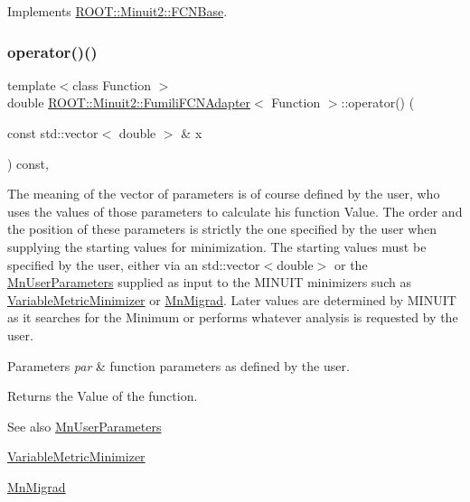 Implements \mbox{\hyperlink{classROOT_1_1Minuit2_1_1FCNBase_ae4a86bd94d0d0f5ca6fc8f8ab2bb43cd}{R\+O\+O\+T\+::\+Minuit2\+::\+F\+C\+N\+Base}}.

\mbox{\label{classROOT_1_1Minuit2_1_1FumiliFCNAdapter_a7381e9f93fbec9e0504e3e340c281056}} 
\subsubsection{\texorpdfstring{operator()()}{operator()()}\hspace{0.1cm}{\footnotesize\ttfamily [2/4]}}
{\footnotesize\ttfamily template$<$class Function $>$ \\
double \mbox{\hyperlink{classROOT_1_1Minuit2_1_1FumiliFCNAdapter}{R\+O\+O\+T\+::\+Minuit2\+::\+Fumili\+F\+C\+N\+Adapter}}$<$ Function $>$\+::operator() (\begin{DoxyParamCaption}\item[{const std\+::vector$<$ double $>$ \&}]{x }\end{DoxyParamCaption}) const\hspace{0.3cm}{\ttfamily [inline]}, {\ttfamily [virtual]}}

The meaning of the vector of parameters is of course defined by the user, who uses the values of those parameters to calculate his function Value. The order and the position of these parameters is strictly the one specified by the user when supplying the starting values for minimization. The starting values must be specified by the user, either via an std\+::vector$<$double$>$ or the \mbox{\hyperlink{classROOT_1_1Minuit2_1_1MnUserParameters}{Mn\+User\+Parameters}} supplied as input to the M\+I\+N\+U\+IT minimizers such as \mbox{\hyperlink{classROOT_1_1Minuit2_1_1VariableMetricMinimizer}{Variable\+Metric\+Minimizer}} or \mbox{\hyperlink{classROOT_1_1Minuit2_1_1MnMigrad}{Mn\+Migrad}}. Later values are determined by M\+I\+N\+U\+IT as it searches for the Minimum or performs whatever analysis is requested by the user.


\begin{DoxyParams}{Parameters}
{\em par} & function parameters as defined by the user.\\
\hline
\end{DoxyParams}
\begin{DoxyReturn}{Returns}
the Value of the function.
\end{DoxyReturn}
\begin{DoxySeeAlso}{See also}
\mbox{\hyperlink{classROOT_1_1Minuit2_1_1MnUserParameters}{Mn\+User\+Parameters}} 

\mbox{\hyperlink{classROOT_1_1Minuit2_1_1VariableMetricMinimizer}{Variable\+Metric\+Minimizer}} 

\mbox{\hyperlink{classROOT_1_1Minuit2_1_1MnMigrad}{Mn\+Migrad}} 
\end{DoxySeeAlso}


